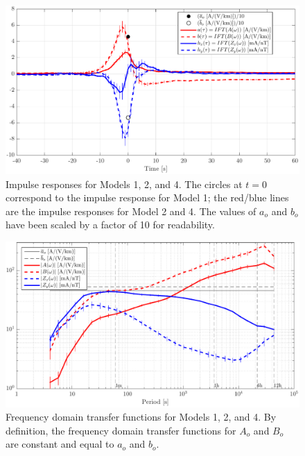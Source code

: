 \documentclass[draft,linenumbers]{agujournal2018}
\begin{document}
\begin{figure}[h]
\centering
\includegraphics[width=\textwidth]{figures/plot_TF_aves_H-options-1.pdf}
\caption{Impulse responses for Models 1, 2, and 4. The circles at $t = 0$ correspond to the impulse response for Model 1; the red/blue lines are the impulse responses for Model 2 and 4. The values of $a_o$ and $b_o$ have been scaled by a factor of 10 for readability.}
\label{H}
\end{figure}

\begin{figure}[h]
\centering
\includegraphics[width=\textwidth]{figures/plot_TF_aves_Z-options-1.pdf}
\caption{Frequency domain transfer functions for Models 1, 2, and 4. By definition, the frequency domain transfer functions for $A_o$ and $B_o$ are constant and equal to $a_o$ and $b_o$.}
\label{Z}
\end{figure}
\end{document}
